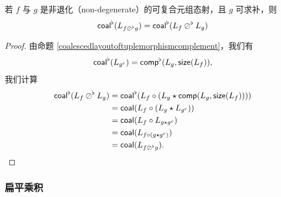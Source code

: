 


\begin{proposition}
    若 $f$ 与 $g$ 是非退化（non-degenerate）的可复合元组态射，且 $g$ 可求补，则
    \[
    \mathsf{coal}^\flat(L_{f \oslash^\flat g}) = \mathsf{coal}^\flat(L_f \oslash^\flat L_g)
    \]
\end{proposition}

\begin{proof}
由命题 \ref{coalescedlayoutoftuplemorphismcomplement}，我们有
\[
\mathsf{coal}^\flat(L_{g^c}) = \mathsf{comp}^\flat(L_g,\mathsf{size}(L_f)),
\]
我们计算
    \begin{align*}
    \mathsf{coal}^\flat(L_f \oslash^\flat L_g) & = \mathsf{coal}^\flat(L_f \circ \left(L_g \star \mathsf{comp}(L_g,\mathsf{size}(L_f))\right))\\
    & = \mathsf{coal}(L_f \circ \left( L_{g} \star L_{g^c} \right))\\
    & = \mathsf{coal}(L_f \circ L_{g\star g^c})\\
    & = \mathsf{coal}(L_{f \circ (g \star g^c)})\\
    & = \mathsf{coal}(L_{f \oslash^\flat g}).
    \end{align*}
\end{proof}

\subsubsection{扁平乘积}
\label{subsubsection.flatproduct}

